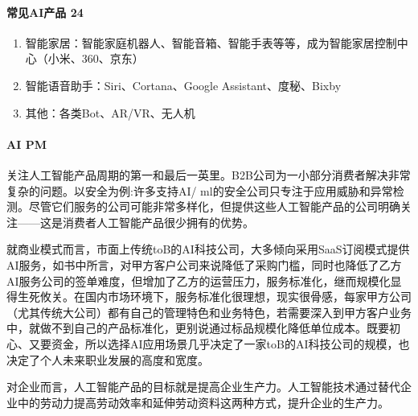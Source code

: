 \documentclass[letterpaper,10pt,english]{sphinxmanual}
\begin{document}
\paragraph{常见AI产品 24\sphinxfootnotemark[92]}
\label{\detokenize{chapter_introduction/2B:ai-24}}%
\begin{footnotetext}[92]\sphinxAtStartFootnote
{}
%
\end{footnotetext}\ignorespaces \begin{enumerate}
%
\item {} 
智能家居：智能家庭机器人、智能音箱、智能手表等等，成为智能家居控制中心（小米、360、京东）

\item {} 
智能语音助手：Siri、Cortana、Google Assistant、度秘、Bixby

\item {} 
其他：各类Bot、AR/VR、无人机

\end{enumerate}


\paragraph{AI PM}
\label{\detokenize{chapter_introduction/2B:ai-pm}}
关注人工智能产品周期的第一和最后一英里。B2B公司为一小部分消费者解决非常复杂的问题。以安全为例:许多支持AI/
ml的安全公司只专注于应用威胁和异常检测。尽管它们服务的公司可能非常多样化，但提供这些人工智能产品的公司明确关注——这是消费者人工智能产品很少拥有的优势。

就商业模式而言，市面上传统toB的AI科技公司，大多倾向采用SaaS订阅模式提供AI服务，如书中所言，对甲方客户公司来说降低了采购门槛，同时也降低了乙方AI服务公司的签单难度，但增加了乙方的运营压力，服务标准化，继而规模化显得生死攸关。在国内市场环境下，服务标准化很理想，现实很骨感，每家甲方公司（尤其传统大公司）都有自己的管理特色和业务特色，若需要深入到甲方客户业务中，就做不到自己的产品标准化，更别说通过标品规模化降低单位成本。既要初心、又要资金，所以选择AI应用场景几乎决定了一家toB的AI科技公司的规模，也决定了个人未来职业发展的高度和宽度。

对企业而言，人工智能产品的目标就是提高企业生产力。人工智能技术通过替代企业中的劳动力提高劳动效率和延伸劳动资料这两种方式，提升企业的生产力。%
\begin{footnote}[93]\sphinxAtStartFootnote
{}
%
\end{footnote}
\end{document}
